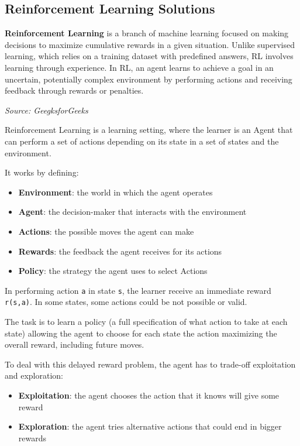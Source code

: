 \subsection{Reinforcement Learning Solutions}
\begin{blockquote}
  \textbf{Reinforcement Learning} is a branch of machine learning focused on
  making decisions to maximize cumulative rewards in a given situation. Unlike supervised
  learning, which relies on a training dataset with predefined answers, RL involves
  learning through experience. In RL, an agent learns to achieve a goal in an uncertain,
  potentially complex environment by performing actions and receiving feedback
  through rewards or penalties.

  \emph{Source: GeegksforGeeks \footnotemark}
\end{blockquote}

Reinforcement Learning is a learning setting, where the learner is an Agent that
can perform a set of actions depending on its state in a set of states and the
environment.

It works by defining:
\begin{itemize}
  \item \textbf{Environment}: the world in which the agent operates

  \item \textbf{Agent}: the decision-maker that interacts with the environment

  \item \textbf{Actions}: the possible moves the agent can make

  \item \textbf{Rewards}: the feedback the agent receives for its actions

  \item \textbf{Policy}: the strategy the agent uses to select Actions
\end{itemize}

In performing action \texttt{a} in state \texttt{s}, the learner receive an immediate
reward \texttt{r(s,a)}. In some states, some actions could be not possible or
valid.

The task is to learn a policy (a full specification of what action to take at each
state) allowing the agent to choose for each state the action maximizing the
overall reward, including future moves.

To deal with this delayed reward problem, the agent has to trade-off
exploitation and exploration:
\begin{itemize}
  \item \textbf{Exploitation}: the agent chooses the action that it knows will give
    some reward

  \item \textbf{Exploration}: the agent tries alternative actions that could end
    in bigger rewards
\end{itemize}


